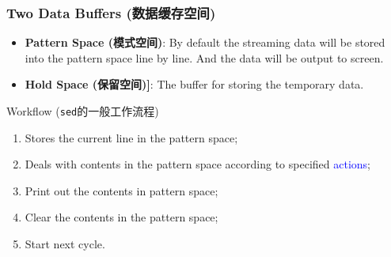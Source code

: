 \documentclass[red]{beamer}
\begin{document}
\begin{CJK*}{UTF8}{gbsn}
\begin{frame}[containsverbatim]
\frametitle{Two Data Buffers (数据缓存空间)}
\begin{itemize}
\footnotesize
	\item \textbf{Pattern Space (模式空间)}: By default the streaming data will be 
		stored into the pattern space line by line. And the data will be output 
		to screen. 
	\item \textbf{Hold Space (保留空间)]}: The buffer for storing the temporary 
		data. 
\end{itemize}
\begin{block}{\centering\footnotesize Workflow (\texttt{sed}的一般工作流程)}
\begin{enumerate}[(1)]
\footnotesize
	\item Stores the current line in the pattern space; 
	\item Deals with contents in the pattern space according 
		to specified \textcolor{blue}{actions};
	\item Print out the contents in pattern space;
	\item Clear the contents in the pattern space;
	\item Start next cycle.
\end{enumerate}
\end{block}
\end{frame}



\end{CJK*}
\end{document}
